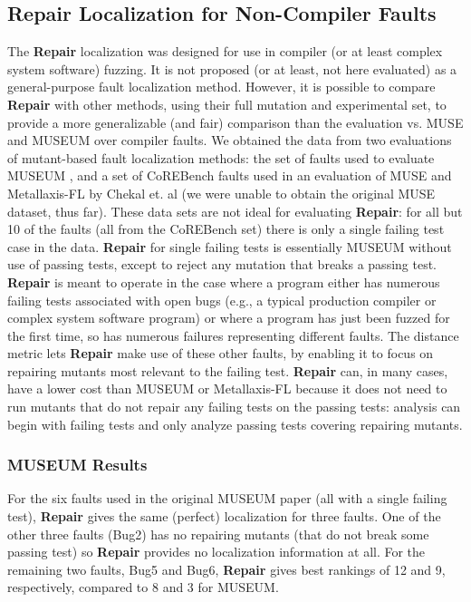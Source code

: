 \subsection{Repair Localization for Non-Compiler Faults}
\label{sec:otherfaults}

The {\bf Repair} localization was designed for use in compiler (or at least complex system software) fuzzing.  It is not proposed (or at least, not here evaluated) as a general-purpose fault localization method.  However, it is possible to compare {\bf Repair} with other methods, using their full mutation and experimental set, to provide a more generalizable (and fair) comparison than the evaluation vs. MUSE and MUSEUM over compiler faults.  We obtained the data from two evaluations of mutant-based fault localization methods:  the set of faults used to evaluate MUSEUM \cite{multilingual}, and a set of CoREBench \cite{CoREBench} faults used in an evaluation of MUSE and Metallaxis-FL by Chekal et. al \cite{Papadakis} (we were unable to obtain the original MUSE dataset, thus far).  These data sets are not ideal for evaluating {\bf Repair}: for all but 10 of the faults (all from the CoREBench set) there is only a single failing test case in the data.  {\bf Repair} for single failing tests is essentially MUSEUM without use of passing tests, except to reject any mutation that breaks a passing test.  {\bf Repair} is meant to operate in the case where a program either has numerous failing tests associated with open bugs (e.g., a typical production compiler or complex system software program) or where a program has just been fuzzed for the first time, so has numerous failures representing different faults.  The distance metric lets {\bf Repair} make use of these other faults, by enabling it to focus on repairing mutants most relevant to the failing test.  {\bf Repair} can, in many cases, have a lower cost than MUSEUM or Metallaxis-FL because it does not need to run mutants that do not repair any failing tests on the passing tests: analysis can begin with failing tests and only analyze passing tests covering repairing mutants.

\subsubsection{MUSEUM Results}  For the six faults used in the original MUSEUM paper (all with a single failing test), {\bf Repair} gives the same (perfect) localization for three faults.  One of the other three faults (Bug2) has no repairing mutants (that do not break some passing test) so {\bf Repair} provides no localization information at all.  For the remaining two faults, Bug5 and Bug6, {\bf Repair} gives best rankings of 12 and 9, respectively, compared to 8 and 3 for MUSEUM.

